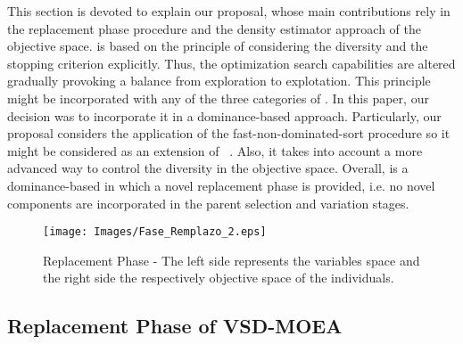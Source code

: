 This section is devoted to explain our proposal, whose main contributions rely in the replacement phase procedure and the density estimator approach of the objective space.
%
\VSDMOEA{} is based on the principle of considering the diversity and the stopping criterion explicitly.
%
Thus, the optimization search capabilities are altered gradually provoking a balance from exploration to explotation.
%
This principle might be incorporated with any of the three categories of \MOEAS{}.
%
In this paper, our decision was to incorporate it in a dominance-based approach.
%
Particularly, our proposal considers the application of the fast-non-dominated-sort procedure so it might be considered as an extension
of \NSGAII{}~\cite{Joel:NSGAII}.
%
Also, it takes into account a more advanced way to control the diversity in the objective space.
%
%
%
Overall, \VSDMOEA{} is a dominance-based \MOEA{} in which a novel replacement phase is provided,
i.e. no novel components are incorporated in the parent selection and variation stages.

\begin{figure}[t]
\centering
\texttt{[image: Images/Fase\_Remplazo\_2.eps]}
\caption{Replacement Phase - The left side represents the variables space and the right side the respectively objective space of the individuals.  }
\label{fig:Hypersphere}
\end{figure}


\subsection{Replacement Phase of VSD-MOEA}


